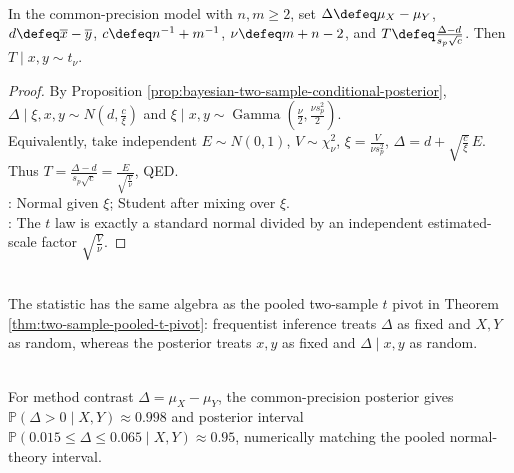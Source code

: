 \begin{proposition} \label{prop:bayesian-two-sample-t-posterior} \\
In the common-precision model with $n,m\geq2$, set $\Delta\defeq\mu_X-\mu_Y$, $d\defeq\overline{x}-\overline{y}$, $c\defeq n^{-1}+m^{-1}$, $\nu\defeq m+n-2$, and $T\defeq\frac{\Delta-d}{s_p\sqrt{c}}$. Then $T\mid x,y\sim t_\nu$.
\begin{proof} By Proposition \ref{prop:bayesian-two-sample-conditional-posterior}, $\Delta\mid\xi,x,y\sim N(d,\frac{c}{\xi})$ and $\xi\mid x,y\sim\operatorname{Gamma}(\frac{\nu}{2},\frac{\nu s_p^2}{2})$.\\
Equivalently, take independent $E\sim N(0,1)$, $V\sim\chi^2_\nu$, $\xi=\frac{V}{\nu s_p^2}$, $\Delta=d+\sqrt{\frac{c}{\xi}}\,E$. Thus $T=\frac{\Delta-d}{s_p\sqrt{c}}=\frac{E}{\sqrt{\frac{V}{\nu}}}$, QED.\\
: Normal given $\xi$; Student after mixing over $\xi$.\\
: The $t$ law is exactly a standard normal divided by an independent estimated-scale factor $\sqrt{\frac{V}{\nu}}$.
\end{proof}
\end{proposition}

\begin{remark} \label{rem:bayesian-two-sample-interpretation} \\
The statistic has the same algebra as the pooled two-sample $t$ pivot in Theorem \ref{thm:two-sample-pooled-t-pivot}: frequentist inference treats $\Delta$ as fixed and $X,Y$ as random, whereas the posterior treats $x,y$ as fixed and $\Delta\mid x,y$ as random.
\end{remark}

\begin{example} \label{ex:bayesian-heat-fusion-comparison} \\
For method contrast $\Delta=\mu_X-\mu_Y$, the common-precision posterior gives $\mathbb{P}(\Delta>0\mid X,Y)\approx0.998$ and posterior interval $\mathbb{P}(0.015\leq\Delta\leq0.065\mid X,Y)\approx0.95$, numerically matching the pooled normal-theory interval.
\end{example}
